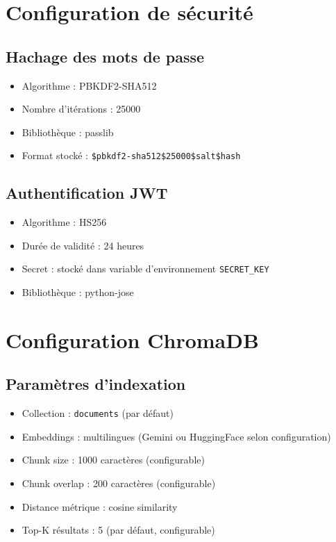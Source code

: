 \section{Configuration de sécurité}

\subsection{Hachage des mots de passe}
\begin{itemize}
    \item Algorithme : PBKDF2-SHA512
    \item Nombre d'itérations : 25000
    \item Bibliothèque : passlib
    \item Format stocké : \texttt{\$pbkdf2-sha512\$25000\$salt\$hash}
\end{itemize}

\subsection{Authentification JWT}
\begin{itemize}
    \item Algorithme : HS256
    \item Durée de validité : 24 heures
    \item Secret : stocké dans variable d'environnement \texttt{SECRET\_KEY}
    \item Bibliothèque : python-jose
\end{itemize}

\section{Configuration ChromaDB}

\subsection{Paramètres d'indexation}
\begin{itemize}
    \item Collection : \texttt{documents} (par défaut)
    \item Embeddings : multilingues (Gemini ou HuggingFace selon configuration)
    \item Chunk size : 1000 caractères (configurable)
    \item Chunk overlap : 200 caractères (configurable)
    \item Distance métrique : cosine similarity
    \item Top-K résultats : 5 (par défaut, configurable)
\end{itemize}

